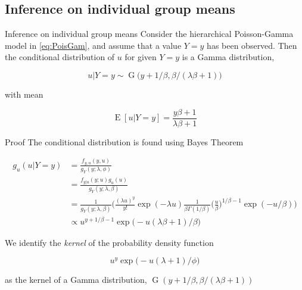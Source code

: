 \documentclass[aspectratio=169]{beamer}
\DeclareMathOperator{\E}{E}
\DeclareMathOperator{\G}{G}
\begin{document}
\hypertarget{inference-on-individual-group-means}{%
\subsection{Inference on individual group
means}\label{inference-on-individual-group-means}}

\begin{frame}{Inference on individual group means}
Consider the hierarchical Poisson-Gamma model in \eqref{eq:PoisGam}, and
assume that a value \(Y=y\) has been observed. Then the conditional
distribution of \(u\) for given \(Y=y\) is a Gamma distribution,

\begin{equation}
  u|Y=y\sim \G\big(y+1/\beta,\beta/(\lambda \beta+1)\big)
\end{equation}

with mean

\begin{equation}
  \E[u|Y=y]=\frac{y\beta+1}{\lambda\beta+1}
\end{equation}
\end{frame}

\begin{frame}{Proof}
\protect\hypertarget{proof-3}{}
The conditional distribution is found using Bayes Theorem

\begin{equation}
  \begin{aligned}
    g_{u}(u|Y=y)&=\frac{f_{y,u}(y,u)}{g_Y(y;\lambda, \phi)} \\
    &=\frac{f_{y|u}(y;u)g_{u}(u)}{g_{Y}(y;\lambda,\beta)} \\
    &=\frac{1}{g_{Y}(y;\lambda,\beta)}\bigg(\frac{(\lambda u)^y}{y!} \exp (-\lambda u) \frac{1}{\beta \Gamma(1/\beta)} \bigg(\frac{u}{\beta}\bigg)^{1/\beta-1} \exp (-u/\beta)\bigg) \\
    &\propto u^{y+1/\beta-1} \exp \big(- u(\lambda\beta+1)/\beta\big)
  \end{aligned}
\end{equation}

We identify the \emph{kernel} of the probability density function

\begin{equation}
  u^{y} \exp \big(- u(\lambda+1)/\phi\big)
\end{equation}

as the kernel of a Gamma distribution,
\(\G(y+1/\beta,\beta/(\lambda\beta+1))\)
\end{frame}
\end{document}
